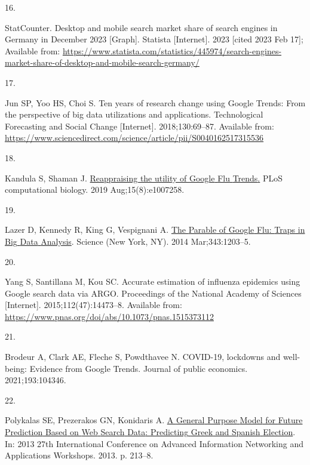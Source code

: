 \documentclass[
  letterpaper,
  DIV=11,
  numbers=noendperiod]{scrartcl}
\newlength{\cslhangindent}
\newlength{\csllabelwidth}
\newlength{\cslentryspacingunit} %
\newenvironment{CSLReferences}[2] %
 {%
  \setlength{\parindent}{0pt}
  \ifodd #1
  \let\oldpar\par
  \def\par{\hangindent=\cslhangindent\oldpar}
  \fi
  \setlength{\parskip}{#2\cslentryspacingunit}
 }%
 {}
\newcommand{\CSLLeftMargin}[1]{\parbox[t]{\csllabelwidth}{#1}}
\newcommand{\CSLRightInline}[1]{\parbox[t]{\linewidth - \csllabelwidth}{#1}\break}
\begin{document}
\begin{CSLReferences}{0}{0}
\leavevmode{}%
\CSLLeftMargin{16. }%
\CSLRightInline{StatCounter. Desktop and mobile search market share of
search engines in {Germany} in {December} 2023 {[}{Graph}{]}. Statista
{[}Internet{]}. 2023 {[}cited 2023 Feb 17{]}; Available from:
\url{https://www.statista.com/statistics/445974/search-engines-market-share-of-desktop-and-mobile-search-germany/}}

\leavevmode{}%
\CSLLeftMargin{17. }%
\CSLRightInline{Jun SP, Yoo HS, Choi S. Ten years of research change
using {Google} {Trends}: {From} the perspective of big data utilizations
and applications. Technological Forecasting and Social Change
{[}Internet{]}. 2018;130:69--87. Available from:
\url{https://www.sciencedirect.com/science/article/pii/S0040162517315536}}

\leavevmode{}%
\CSLLeftMargin{18. }%
\CSLRightInline{Kandula S, Shaman J.
\href{https://doi.org/10.1371/journal.pcbi.1007258}{Reappraising the
utility of {Google} {Flu} {Trends}.} PLoS computational biology. 2019
Aug;15(8):e1007258. }

\leavevmode{}%
\CSLLeftMargin{19. }%
\CSLRightInline{Lazer D, Kennedy R, King G, Vespignani A.
\href{https://doi.org/10.1126/science.1248506}{The {Parable} of {Google}
{Flu}: {Traps} in {Big} {Data} {Analysis}}. Science (New York, NY). 2014
Mar;343:1203--5. }

\leavevmode{}%
\CSLLeftMargin{20. }%
\CSLRightInline{Yang S, Santillana M, Kou SC. Accurate estimation of
influenza epidemics using {Google} search data via {ARGO}. Proceedings
of the National Academy of Sciences {[}Internet{]}.
2015;112(47):14473--8. Available from:
\url{https://www.pnas.org/doi/abs/10.1073/pnas.1515373112}}

\leavevmode{}%
\CSLLeftMargin{21. }%
\CSLRightInline{Brodeur A, Clark AE, Fleche S, Powdthavee N. {COVID}-19,
lockdowns and well-being: {Evidence} from {Google} {Trends}. Journal of
public economics. 2021;193:104346. }

\leavevmode{}%
\CSLLeftMargin{22. }%
\CSLRightInline{Polykalas SE, Prezerakos GN, Konidaris A.
\href{https://doi.org/10.1109/WAINA.2013.155}{A {General} {Purpose}
{Model} for {Future} {Prediction} {Based} on {Web} {Search} {Data}:
{Predicting} {Greek} and {Spanish} {Election}}. In: 2013 27th
{International} {Conference} on {Advanced} {Information} {Networking}
and {Applications} {Workshops}. 2013. p. 213--8. }


\end{CSLReferences}
\end{document}
